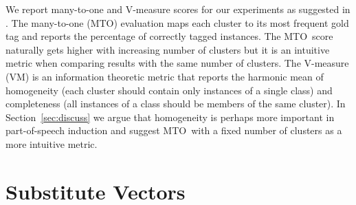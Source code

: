 \documentclass[11pt]{article}
\newcommand{\mto}{\mbox{MTO }}
\newcommand{\vm}{\mbox{VM }}
\begin{document}
We report many-to-one and V-measure scores for our experiments as
suggested in \cite{Christodoulopoulos:2010:TDU:1870658.1870714}.  The
many-to-one (MTO) evaluation maps each cluster to its most frequent
gold tag and reports the percentage of correctly tagged instances.
The \mto score naturally gets higher with increasing number of
clusters but it is an intuitive metric when comparing results with the
same number of clusters.  The V-measure (VM) \cite{rosenberg2007v} is
an information theoretic metric that reports the harmonic mean of
homogeneity (each cluster should contain only instances of a single
class) and completeness (all instances of a class should be members of
the same cluster).  In Section~\ref{sec:discuss} we argue that
homogeneity is perhaps more important in part-of-speech induction and
suggest \mto with a fixed number of clusters as a more intuitive
metric.



\section{Substitute Vectors}
\label{sec:lm}
\end{document}
